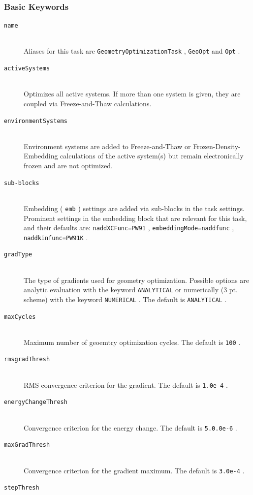 \documentclass[bibliography=totocnumbered,a4paper,10pt,oneside]{scrbook}
\newcommand{\ttt}[1]{%
  \begingroup\setlength{\fboxsep}{1pt}%
  \colorbox{serenity-green!30}{\texttt{\hspace*{2pt}\vphantom{(g}#1\hspace*{2pt}}}%
  \endgroup
}
\begin{document}
\subsubsection{Basic Keywords}
\begin{description}
 \item [\texttt{name}]\hfill \\
   Aliases for this task are \ttt{GeometryOptimizationTask} , \ttt{GeoOpt} and \ttt{Opt}.
 \item [\texttt{activeSystems}]\hfill \\
   Optimizes all active systems. If more than one system is given, they are coupled via Freeze-and-Thaw calculations.
 \item [\texttt{environmentSystems}]\hfill \\
  Environment systems are added to Freeze-and-Thaw or Frozen-Density-Embedding calculations of the active system(s) but remain electronically frozen and are not optimized.
 \item [\texttt{sub-blocks}]\hfill \\
   Embedding (\ttt{emb}) settings are added via sub-blocks in the task settings.
   Prominent settings in the embedding block that are relevant for this task, and their defaults are:
   \ttt{naddXCFunc=PW91}, \ttt{embeddingMode=naddfunc}, \ttt{naddkinfunc=PW91K}.
 \item [\texttt{gradType}]\hfill \\
   The type of gradients used for geometry optimization. Possible options are analytic evaluation with the keyword \ttt{ANALYTICAL} or numerically (3 pt. scheme) with the keyword \ttt{NUMERICAL}. The default is \ttt{ANALYTICAL}.
 \item [\texttt{maxCycles}]\hfill \\
   Maximum number of  geoemtry optimization cycles. The default is \ttt{100}.
 \item [\texttt{rmsgradThresh}]\hfill \\
   RMS convergence criterion for the gradient. The default is \ttt{1.0e-4}. 
 \item [\texttt{energyChangeThresh}]\hfill \\
   Convergence criterion for the energy change. The default is \ttt{5.0.0e-6}. 
 \item [\texttt{maxGradThresh}]\hfill \\ 
  Convergence criterion for the gradient maximum. The default is \ttt{3.0e-4}. 
 \item [\texttt{stepThresh}]\hfill \\

\end{description}
\end{document}
